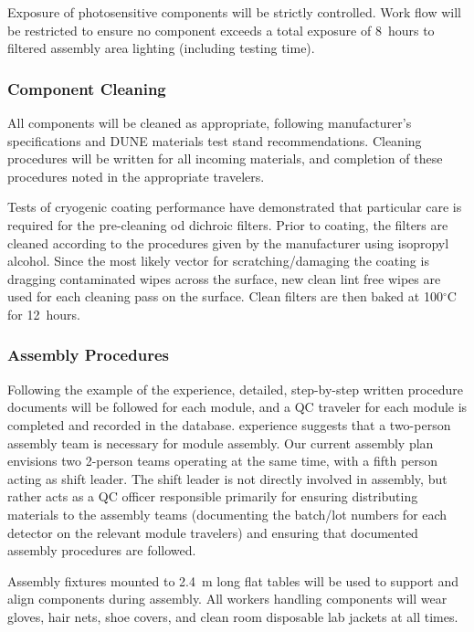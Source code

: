 
Exposure of photosensitive components will be strictly controlled.  Work flow will be restricted to ensure no component exceeds a total exposure of \SI{8}{hours} to filtered assembly area lighting (including testing time).

\subsubsection{Component Cleaning}

All components will be cleaned  as appropriate, following manufacturer's specifications and DUNE materials test stand recommendations.  Cleaning procedures will be written for all incoming materials, and completion of these procedures noted in the appropriate travelers.

Tests of cryogenic coating performance have demonstrated that particular care is required for the pre-cleaning od dichroic filters.  Prior to coating, the filters are cleaned according to the procedures given by the manufacturer using isopropyl alcohol. Since the most likely vector for scratching/damaging the coating is dragging contaminated wipes across the surface, new clean lint free wipes are used for each  cleaning pass on the surface. Clean filters are then baked at 100$^\circ$C for \SI{12}{hours}. 


\subsubsection{Assembly Procedures}

Following the example of the  experience, detailed, step-by-step written procedure documents will be followed for each module, and a QC traveler for each module is completed and recorded in the database.   experience suggests that a two-person assembly team is necessary for module assembly. 
Our current assembly plan envisions two 2-person teams operating at the same time, with a fifth person acting as shift leader.  The shift leader is not directly involved in assembly, but rather acts as a QC officer responsible primarily for ensuring distributing materials to the assembly teams (documenting the batch/lot numbers for each detector on the relevant module travelers) and ensuring that documented assembly procedures are followed.

Assembly fixtures mounted to \SI{2.4}{m} long flat tables will be used to support and align  components during assembly.  All workers handling  components will wear gloves, hair nets, shoe covers, and clean room disposable lab jackets at all times.

